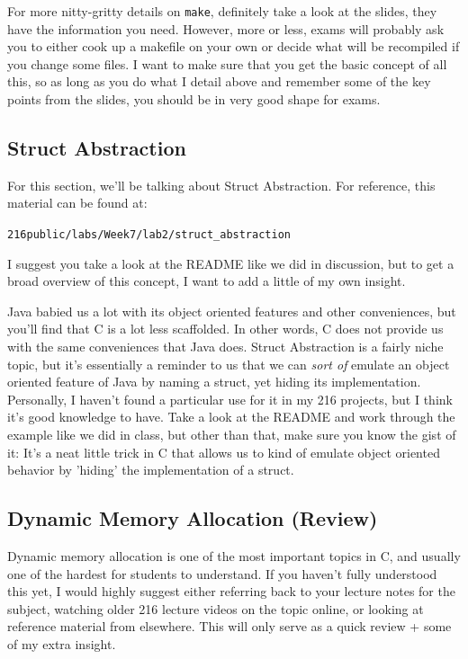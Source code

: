 \documentclass[english, 10pt]{article}
\begin{document}
For more nitty-gritty details on \texttt{make}, definitely take a look at the slides, they have the information you need. However, more or less, exams will probably ask you to either cook up a makefile on your own or decide what will be recompiled if you change some files. I want to make sure that you get the basic concept of all this, so as long as you do what I detail above and remember some of the key points from the slides, you should be in very good shape for exams.\newline

\subsection{Struct Abstraction}

For this section, we'll be talking about Struct Abstraction. For reference, this material can be found at:\newline 

\texttt{216public/labs/Week7/lab2/struct\_abstraction} \newline

I suggest you take a look at the README like we did in discussion, but to get a broad overview of this concept, I want to add a little of my own insight. \newline

Java babied us a lot with its object oriented features and other conveniences, but you'll find that C is a lot less scaffolded. In other words, C does not provide us with the same conveniences that Java does. Struct Abstraction is a fairly niche topic, but it's essentially a reminder to us that we can \textit{sort of} emulate an object oriented feature of Java by naming a struct, yet hiding its implementation. Personally, I haven't found a particular use for it in my 216 projects, but I think it's good knowledge to have. Take a look at the README and work through the example like we did in class, but other than that, make sure you know the gist of it: It's a neat little trick in C that allows us to kind of emulate object oriented behavior by 'hiding' the implementation of a struct.

\subsection{Dynamic Memory Allocation (Review)}

Dynamic memory allocation is one of the most important topics in C, and usually one of the hardest for students to understand. If you haven't fully understood this yet, I would highly suggest either referring back to your lecture notes for the subject, watching older 216 lecture videos on the topic online, or looking at reference material from elsewhere. This will only serve as a quick review + some of my extra insight.\newline
\end{document}

